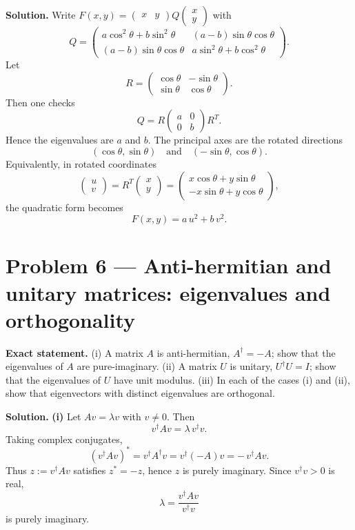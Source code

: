 \documentclass[12pt,a4paper]{article}
\theoremstyle{plain}
\theoremstyle{definition}      %
\begin{document}
\textbf{Solution.}
Write $F(x,y)=\begin{pmatrix}x&y\end{pmatrix}Q\begin{pmatrix}x\\y\end{pmatrix}$ with
\[
Q=
\begin{pmatrix}
	a\cos^2\theta+b\sin^2\theta & (a-b)\sin\theta\cos\theta\\
	(a-b)\sin\theta\cos\theta & a\sin^2\theta+b\cos^2\theta
\end{pmatrix}.
\]
Let
\[
R=
\begin{pmatrix}
	\cos\theta&-\sin\theta\\
	\sin\theta&\cos\theta
\end{pmatrix}.
\]
Then one checks
\[
Q=R\begin{pmatrix}a&0\\0&b\end{pmatrix}R^T.
\]
Hence the eigenvalues are $a$ and $b$. The principal axes are the rotated directions
\[
(\cos\theta,\sin\theta)\quad\text{and}\quad(-\sin\theta,\cos\theta).
\]
Equivalently, in rotated coordinates
\[
\begin{pmatrix}u\\v\end{pmatrix}=R^T\begin{pmatrix}x\\y\end{pmatrix}
=
\begin{pmatrix}
	x\cos\theta+y\sin\theta\\
	-x\sin\theta+y\cos\theta
\end{pmatrix},
\]
the quadratic form becomes
\[
F(x,y)=a\,u^2+b\,v^2.
\]


\section*{Problem 6 — Anti-hermitian and unitary matrices: eigenvalues and orthogonality}

\textbf{Exact statement.}
(i) A matrix $A$ is anti-hermitian, $A^\dagger=-A$; show that the eigenvalues of $A$ are pure-imaginary.
(ii) A matrix $U$ is unitary, $U^\dagger U=I$; show that the eigenvalues of $U$ have unit modulus.
(iii) In each of the cases (i) and (ii), show that eigenvectors with distinct eigenvalues are orthogonal.

\textbf{Solution.}
\textbf{(i)} Let $Av=\lambda v$ with $v\neq 0$. Then
\[
v^\dagger Av=\lambda\, v^\dagger v.
\]
Taking complex conjugates,
\[
(v^\dagger Av)^* = v^\dagger A^\dagger v = v^\dagger(-A)v = -\,v^\dagger Av.
\]
Thus $z:=v^\dagger Av$ satisfies $z^*=-z$, hence $z$ is purely imaginary. Since $v^\dagger v>0$ is real,
\[
\lambda=\frac{v^\dagger Av}{v^\dagger v}
\]
is purely imaginary.
\end{document}
